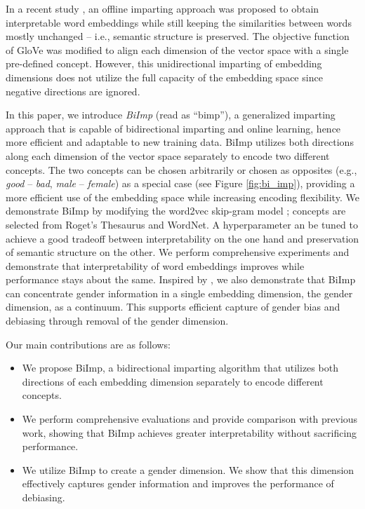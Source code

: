 \documentclass[11pt,a4paper]{article}
\def\proposedmethod{BiImp}
\begin{document}
In a recent study  \citep{senel20impart}, an offline  imparting approach was proposed to obtain
interpretable word embeddings while still keeping
the similarities between words mostly unchanged -- i.e., semantic structure is preserved. The
objective function of GloVe 
\citep{pennington14glove} was modified to align each
dimension of the vector space with a single
pre-defined concept. However, this unidirectional imparting
of embedding dimensions does not utilize the full capacity
of the embedding space since negative directions are
ignored.



In this paper, we introduce \textit{\proposedmethod{}} (read
as ``bimp''), a generalized imparting approach that is capable of bidirectional imparting and online learning, hence more efficient and adaptable to new training data. 
\proposedmethod{} utilizes both directions along each
dimension of the vector space separately to encode two
different concepts. The two concepts  can be chosen arbitrarily or chosen as opposites (e.g., \textit{good} -- \textit{bad}, \textit{male} -- \textit{female}) as a special case (see Figure \ref{fig:bi_imp}), providing a more efficient use of the embedding space while increasing encoding flexibility. 
We demonstrate \proposedmethod{} by modifying the word2vec
skip-gram model
\citep{mikolov13word2vec_a,mikolov13word2vec_b}; concepts
are selected from Roget's Thesaurus and WordNet.
A hyperparameter an be tuned to achieve a good tradeoff
between interpretability on the one hand and
preservation of semantic structure on the other.
We perform comprehensive experiments  and demonstrate that
interpretability of word embeddings improves while
performance stays about the same.
Inspired by  \citet{bolukbasi16debiasing}, we also
demonstrate that \proposedmethod{} can concentrate gender
information in a single embedding dimension, the gender dimension, as a continuum. 
This supports efficient capture of gender bias 
and debiasing through removal of the gender dimension.

Our main contributions are as follows:
\begin{itemize}
    \item We propose \proposedmethod{}, a bidirectional imparting algorithm that utilizes both directions of each embedding dimension separately to encode different concepts.
    
    \item We perform comprehensive evaluations and provide comparison with  previous work, showing that \proposedmethod{} achieves greater interpretability  without sacrificing performance. 
    
    \item We utilize \proposedmethod{} to create a gender dimension. We show that this dimension effectively captures gender information and improves the performance of debiasing.
\end{itemize}
\end{document}
